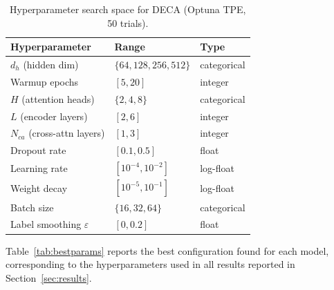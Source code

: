 \documentclass[final,3p,times,authoryear]{elsarticle}
\begin{document}
\begin{table}[ht]
\centering
\caption{Hyperparameter search space for DECA (Optuna TPE, 50 trials).}
\label{tab:hyperspaces}
\small
\begin{tabular}{lll}
\hline
Hyperparameter & Range & Type \\
\hline
$d_h$ (hidden dim)           & $\{64, 128, 256, 512\}$  & categorical \\
Warmup epochs                & $[5, 20]$                 & integer \\
$H$ (attention heads)        & $\{2, 4, 8\}$             & categorical \\
$L$ (encoder layers)         & $[2, 6]$                  & integer \\
$N_{ca}$ (cross-attn layers) & $[1, 3]$                  & integer \\
Dropout rate                 & $[0.1, 0.5]$              & float \\
Learning rate                & $[10^{-4}, 10^{-2}]$      & log-float \\
Weight decay                 & $[10^{-5}, 10^{-1}]$      & log-float \\
Batch size                   & $\{16, 32, 64\}$          & categorical \\
Label smoothing $\varepsilon$& $[0, 0.2]$                & float \\
\hline
\end{tabular}
\end{table}

Table~\ref{tab:bestparams} reports the best configuration found for
each model, corresponding to the hyperparameters used in all results
reported in Section~\ref{sec:results}.
\end{document}
